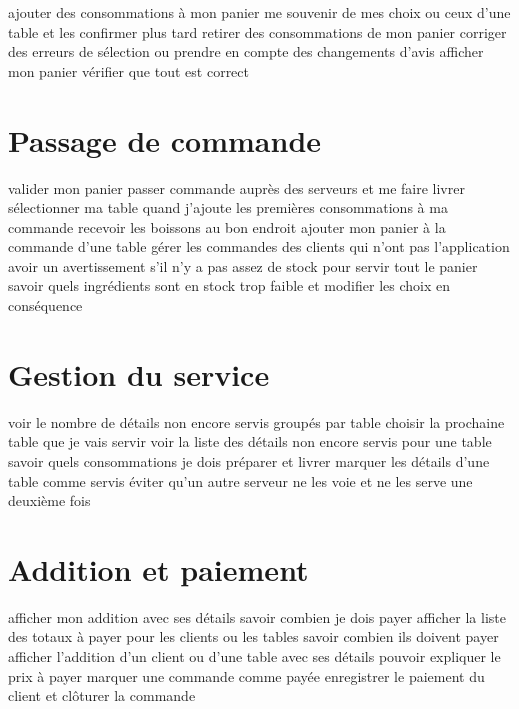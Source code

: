 \documentclass[a4paper,10pt]{article}
\begin{document}
{ajouter des consommations à mon panier}
{me souvenir de mes choix ou ceux d'une table et les confirmer plus tard}
{retirer des consommations de mon panier}
{corriger des erreurs de sélection ou prendre en compte des changements d'avis}
{afficher mon panier}
{vérifier que tout est correct}

\section{Passage de commande}

{valider mon panier}
{passer commande auprès des serveurs et me faire livrer}
{sélectionner ma table quand j'ajoute les premières consommations à ma commande}
{recevoir les boissons au bon endroit}
{ajouter mon panier à la commande d'une table}
{gérer les commandes des clients qui n'ont pas l'application}
{avoir un avertissement s'il n'y a pas assez de stock pour servir tout le panier}
{savoir quels ingrédients sont en stock trop faible et modifier les choix en conséquence}

\section{Gestion du service}

{voir le nombre de détails non encore servis groupés par table}
{choisir la prochaine table que je vais servir}
{voir la liste des détails non encore servis pour une table}
{savoir quels consommations je dois préparer et livrer}
{marquer les détails d'une table comme servis}
{éviter qu'un autre serveur ne les voie et ne les serve une deuxième fois}

\section{Addition et paiement}

{afficher mon addition avec ses détails}
{savoir combien je dois payer}
{afficher la liste des totaux à payer pour les clients ou les tables}
{savoir combien ils doivent payer}
{afficher l'addition d'un client ou d'une table avec ses détails}
{pouvoir expliquer le prix à payer}
{marquer une commande comme payée}
{enregistrer le paiement du client et clôturer la commande}
\end{document}
